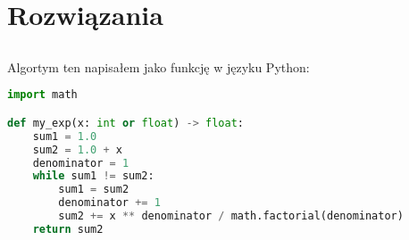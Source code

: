 \documentclass{article}
\begin{document}
\section{Rozwiązania}

\subsection{}
Algortym ten napisałem jako funkcję w języku Python:
\begin{lstlisting}[language=Python]
import math

def my_exp(x: int or float) -> float:
    sum1 = 1.0
    sum2 = 1.0 + x
    denominator = 1
    while sum1 != sum2:
        sum1 = sum2
        denominator += 1
        sum2 += x ** denominator / math.factorial(denominator)
    return sum2
\end{lstlisting}
\end{document}
